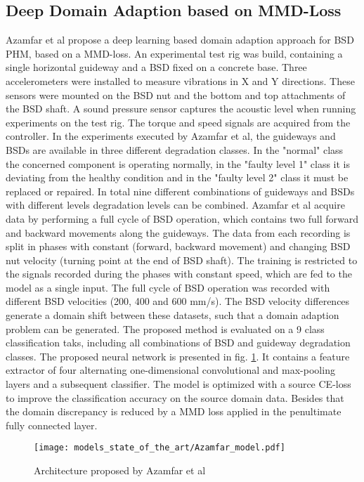 \subsection{Deep Domain Adaption based on MMD-Loss}
Azamfar et al \cite{AZAMFAR2020103932} propose a deep learning based domain adaption approach for BSD PHM, based on a MMD-loss. An experimental test rig was build, containing a single horizontal guideway and a BSD fixed on a concrete base. Three accelerometers were installed to measure vibrations in X and Y directions. These sensors were mounted on the BSD nut and the bottom and top attachments of the BSD shaft. A sound pressure sensor captures the acoustic level when running experiments on the test rig. The torque and speed signals are acquired from the controller. In the experiments executed by Azamfar et al, the guideways and BSDs are available in three different degradation classes. In the "normal" class the concerned component is operating normally, in the "faulty level 1" class it is deviating from the healthy condition and in the "faulty level 2" class it must be replaced or repaired. In total nine different combinations of guideways and BSDs with different levels degradation levels can be combined. Azamfar et al acquire data by performing a full cycle of BSD operation, which contains two full forward and backward movements along the guideways. The data from each recording is split in phases with constant (forward, backward movement) and changing BSD nut velocity (turning point at the end of BSD shaft). The training is restricted to the signals recorded during the phases with constant speed, which are fed to the model as a single input. The full cycle of BSD operation was recorded with different BSD velocities (200, 400 and 600 mm/s). The BSD velocity differences generate a domain shift between these datasets, such that a domain adaption problem can be generated. The proposed method is evaluated on a 9 class classification taks, including all combinations of BSD and guideway degradation classes. The proposed neural network is presented in fig. \ref{fig:Azamfar_model}. It contains a feature extractor of four alternating one-dimensional convolutional and max-pooling layers and a subsequent classifier. The model is optimized with a source CE-loss to improve the classification accuracy on the source domain data. Besides that the domain discrepancy is reduced by a MMD loss applied in the penultimate fully connected layer. 

\begin{figure}[H]
  \centering
  \texttt{[image: models\_state\_of\_the\_art/Azamfar\_model.pdf]}
  \caption{Architecture proposed by Azamfar et al \cite{AZAMFAR2020103932}}
  \label{fig:Azamfar_model}
\end{figure}


